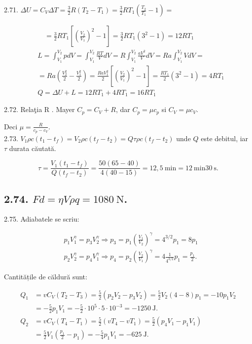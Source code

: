 \documentclass[10pt]{article}
\begin{document}
2.71. $\Delta U=C_{V} \Delta T=\frac{3}{2} R\left(T_{2}-T_{1}\right)=\frac{3}{2} R T_{1}\left(\frac{T_{2}}{T_{1}}-1\right)=$

$$
\begin{aligned}
& \quad=\frac{3}{2} R T_{1}\left[\left(\frac{V_{2}}{V_{1}}\right)^{2}-1\right]=\frac{3}{2} R T_{1}\left(3^{2}-1\right)=12 R T_{1} \\
& L=\int_{V_{1}}^{V_{2}} p d V=\int_{V_{1}}^{V_{2}} \frac{R T}{V} d V=R \int_{V_{1}}^{V_{2}} \frac{a V^{2}}{V} d V=R a \int_{V_{1}}^{V_{2}} V d V= \\
& =R a\left(\frac{V_{2}^{2}}{2}-\frac{V_{1}^{2}}{2}\right)=\frac{R a V_{1}^{2}}{2}\left[\left(\frac{V_{2}}{V_{1}}\right)^{2}-1\right]=\frac{R T_{1}}{2}\left(3^{2}-1\right)=4 R T_{1} \\
& Q=\Delta U+L=12 R T_{1}+4 R T_{1}=16 R T_{1}
\end{aligned}
$$

2.72. Relaţia R . Mayer $C_{p}=C_{V}+R$, dar $C_{p}=\mu c_{p}$ si $C_{V}=\mu c_{V}$.

Deci $\mu=\frac{R}{c_{p}-c_{V}}$.\\
2.73. $V_{1} \rho c\left(t_{1}-t_{f}\right)=V_{2} \rho c\left(t_{f}-t_{2}\right)=Q \tau \rho c\left(t_{f}-t_{2}\right)$ unde $Q$ este debitul, iar $\tau$ durata căutată.

$$
\tau=\frac{V_{1}\left(t_{1}-t_{f}\right)}{Q\left(t_{f}-t_{2}\right)}=\frac{50(65-40)}{4(40-15)}=12,5 \mathrm{~min}=12 \mathrm{~min} 30 \mathrm{~s} .
$$

\subsection*{2.74. $F d=\eta V \rho q=1080 \mathrm{~N}$.}
2.75. Adiabatele se scriu:

$$
\begin{aligned}
& p_{1} V_{1}^{\gamma}=p_{3} V_{2}^{\gamma} \Rightarrow p_{3}=p_{1}\left(\frac{V_{1}}{V_{2}}\right)^{\gamma}=4^{3 / 2} p_{1}=8 p_{1} \\
& p_{2} V_{2}^{\gamma}=p_{4} V_{1}^{\gamma} \Rightarrow p_{4}=p_{2}\left(\frac{V_{2}}{V_{1}}\right)^{\gamma}=4 \frac{1}{4^{3 / 2}} p_{1}=\frac{p_{1}}{2} .
\end{aligned}
$$

Cantitățile de căldură sunt:

$$
\begin{aligned}
Q_{1} & =v C_{V}\left(T_{2}-T_{3}\right)=\frac{5}{2}\left(p_{2} V_{2}-p_{3} V_{2}\right)=\frac{5}{2} V_{2}(4-8) p_{1}=-10 p_{1} V_{2} \\
& =-\frac{5}{2} p_{1} V_{1}=-\frac{5}{2} \cdot 10^{5} \cdot 5 \cdot 10^{-3}=-1250 \mathrm{~J} . \\
Q_{2} & =v C_{V}\left(T_{4}-T_{1}\right)=\frac{5}{2}\left(v T_{4}-v T_{1}\right)=\frac{5}{2}\left(p_{4} V_{1}-p_{1} V_{1}\right) \\
& =\frac{5}{2} V_{1}\left(\frac{p_{1}}{2}-p_{1}\right)=-\frac{5}{4} p_{1} V_{1}=-625 \mathrm{~J} .
\end{aligned}
$$
\end{document}
